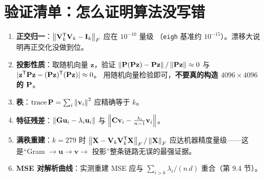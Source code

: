 \section{验证清单：怎么证明算法没写错}

\begin{enumerate}
  \item \textbf{正交归一}：$\left\lVert \mathbf{V}_k^{\mathsf{T}}\mathbf{V}_k-\mathbf{I}_k \right\rVert_F$ 应在 $10^{-10}$ 量级
  （\texttt{eigh} 基准约 $10^{-15}$）。漂移大说明再正交化没做到位。
  \item \textbf{投影性质}：取随机向量 $\mathbf{z}$，验证
  $\left\lVert \mathbf{P}(\mathbf{P}\mathbf{z})-\mathbf{P}\mathbf{z} \right\rVert/\left\lVert \mathbf{P}\mathbf{z} \right\rVert\approx 0$
  与 $|\mathbf{z}^{\mathsf{T}}\mathbf{P}\mathbf{z}-(\mathbf{P}\mathbf{z})^{\mathsf{T}}(\mathbf{P}\mathbf{z})|\approx 0$。
  用随机向量检验即可，\textbf{不要真的构造 $4096\times4096$ 的 $\mathbf{P}$}。
  \item \textbf{秩}：$\operatorname{trace}\mathbf{P}=\sum_i\left\lVert \mathbf{v}_i \right\rVert^2$ 应精确等于 $k$。
  \item \textbf{特征残差}：$\left\lVert \mathbf{G}\mathbf{u}_i-\lambda_i\mathbf{u}_i \right\rVert$ 与
  $\left\lVert \mathbf{C}\mathbf{v}_i-\frac{\lambda_i}{n-1}\mathbf{v}_i \right\rVert$。
  \item \textbf{满秩重建}：$k=279$ 时 $\left\lVert \mathbf{X}-\mathbf{V}_k\mathbf{V}_k^{\mathsf{T}}\mathbf{X} \right\rVert_F/\left\lVert \mathbf{X} \right\rVert_F$
  应达机器精度量级——这是“Gram $\to\mathbf{u}\to\mathbf{v}\to$ 投影”整条链路无误的最强证据。
  \item \textbf{MSE 对解析曲线}：实测重建 MSE 应与 $\sum_{i>k}\lambda_i/(n\,d)$ 重合（第 9.4 节）。
\end{enumerate}
